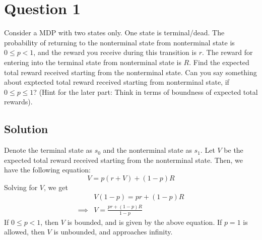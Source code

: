 \section*{Question 1}

Consider a MDP with two states only.
One state is terminal/dead.
The probability of returning to the nonterminal state from nonterminal state is \( 0 \leq p<1 \), and the reward you receive during this transition is \( r \).
The reward for entering into the terminal state from nonterminal state is \( R \).
Find the expected total reward received starting from the nonterminal state.
Can you say something about exptected total reward received starting from nonterminal state, if \( 0 \leq p \leq 1 \)?
(Hint for the later part: Think in terms of boundness of expected total rewards).

\subsection*{Solution}

Denote the terminal state as \( s_0 \) and the nonterminal state as \( s_1 \).
Let \( V \) be the expected total reward received starting from the nonterminal state.
Then, we have the following equation:
\[
    V = p(r + V) + (1-p)R
\]
Solving for \( V \), we get
\begin{align*}
     &
    V(1 - p) = pr + (1-p)R
    \\
    \implies
     &
    \boxed{ V = \frac{pr + (1-p)R}{1-p} }
\end{align*}
If \( 0 \leq p < 1 \), then \( V \) is bounded, and is given by the above equation.
If \( p = 1 \) is allowed, then \( V \) is unbounded, and approaches infinity.
